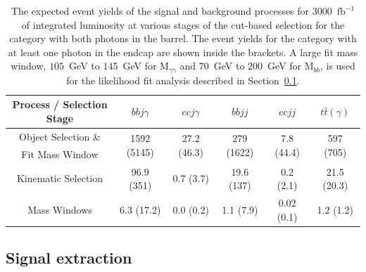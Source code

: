 \begin{table}[!ht]
\begin{center}
\vspace{2mm}

\begin{tabular}{|c|c|c|c|c|c|}
\hline
Process / Selection Stage           &  $bb j\gamma$                  &  $ccj\gamma$                  & $bb jj$                    &  $ccjj$                       & $t\bar{t}(\gamma)$                \\  \hline
Object Selection \&                 &  \multirow{2}{*}{1592 (5145)}   &  \multirow{2}{*}{27.2 (46.3)}   & \multirow{2}{*}{279 (1622)} &  \multirow{2}{*}{7.8 (44.4)}  &  \multirow{2}{*}{597 (705)} \\ 
Fit Mass Window                     &                                &                               &                            &                               &                           \\ 
Kinematic Selection                 &  96.9  (351)                     &  0.7  (3.7)                   & 19.6 (137)                   &  0.2 (2.1)                    &  21.5 (20.3)                \\ 
Mass Windows                        &  6.3 (17.2)                     &  0.0  (0.2)                   & 1.1 (7.9)                 &  0.02 (0.1)                   &  1.2 (1.2)                \\  \hline
\end{tabular}
\caption{ The expected event yields of the signal and background processes
for $3000$~$\mathrm{fb}^{-1}$ of integrated luminosity at various stages of the cut-based selection for 
the category with both photons in the barrel. The event yields for the category with at least one photon in the endcap are shown inside the brackets. A large fit mass
window, $105$~GeV to $145$~GeV for $\mathrm{M}_{\gamma\gamma}$ and $70$~GeV to $200$~GeV for $\mathrm{M}_{bb}$,
is used for the likelihood fit analysis described in Section~\ref{sec:signalextraction}. }
\label{tab:EventYields}
\end{center}
\end{table}


\subsection{Signal extraction}
\label{sec:signalextraction}

